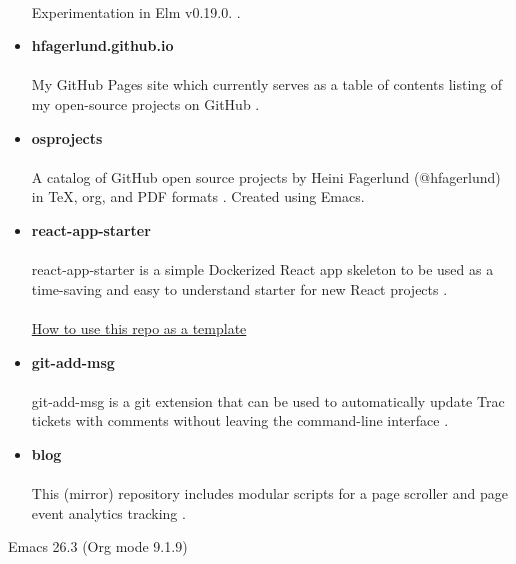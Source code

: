\documentclass[11pt]{article}
\begin{document}
\begin{itemize}
\paragraph{}
Experimentation in Elm v0.19.0.
 \cite{elm}.
\item \textbf{hfagerlund.github.io}
\paragraph{}
My GitHub Pages site which currently serves as a table of contents listing of my open-source projects on GitHub \cite{ghpages}.
\item \textbf{osprojects}
\paragraph{}
A catalog of GitHub open source projects by Heini Fagerlund (@hfagerlund) in \TeX{}, org, and PDF formats \cite{osprojects}. Created using Emacs.
\item \textbf{react-app-starter}
\paragraph{}
react-app-starter is a simple Dockerized React app skeleton to be used as a time-saving and easy to understand starter for new React projects \cite{react-app-starter}.
\paragraph{}
\href{https://docs.github.com/en/github/creating-cloning-and-archiving-repositories/creating-a-repository-on-github/creating-a-repository-from-a-template}{How to use this repo as a template}
\item \textbf{git-add-msg}
\paragraph{}
git-add-msg is a git extension that can be used to automatically update Trac tickets with comments without leaving the command-line interface \cite{git-add-msg}.
\item \textbf{blog}
\paragraph{}
This (mirror) repository includes modular scripts for a page scroller and page event analytics tracking \cite{blog}.
\end{itemize}

\begin{LaTeX}
\begin{sloppypar}


\end{sloppypar}
\end{LaTeX}
Emacs 26.3 (Org mode 9.1.9)
\end{document}
